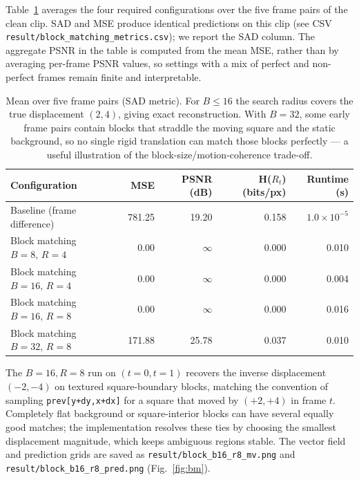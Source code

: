 \documentclass[10pt,a4paper]{article}
\begin{document}
Table~\ref{tab:bm} averages the four required configurations over the five frame pairs of the clean clip. SAD and MSE produce identical predictions on this clip (see CSV \texttt{result/block\_matching\_metrics.csv}); we report the SAD column. The aggregate PSNR in the table is computed from the mean MSE, rather than by averaging per-frame PSNR values, so settings with a mix of perfect and non-perfect frames remain finite and interpretable.

\begin{table}[H]
    \centering
    \begin{tabular}{lrrrr}
        \toprule
        Configuration & MSE & PSNR (dB) & H($R_t$) (bits/px) & Runtime (s) \\
        \midrule
        Baseline (frame difference)  & 781.25 & 19.20 & 0.158 & $1.0\!\times\!10^{-5}$ \\
        Block matching $B{=}8,\,R{=}4$  & 0.00 & $\infty$ & 0.000 & 0.010 \\
        Block matching $B{=}16,\,R{=}4$ & 0.00 & $\infty$ & 0.000 & 0.004 \\
        Block matching $B{=}16,\,R{=}8$ & 0.00 & $\infty$ & 0.000 & 0.016 \\
        Block matching $B{=}32,\,R{=}8$ & 171.88 & 25.78 & 0.037 & 0.010 \\
        \bottomrule
    \end{tabular}
    \caption{Mean over five frame pairs (SAD metric). For $B\le16$ the search radius covers the true displacement $(2,4)$, giving exact reconstruction. With $B=32$, some early frame pairs contain blocks that straddle the moving square and the static background, so no single rigid translation can match those blocks perfectly --- a useful illustration of the block-size/motion-coherence trade-off.}
    \label{tab:bm}
\end{table}

The $B{=}16,R{=}8$ run on $(t{=}0,t{=}1)$ recovers the inverse displacement $(-2,-4)$ on textured square-boundary blocks, matching the convention of sampling \texttt{prev[y+dy,x+dx]} for a square that moved by $(+2,+4)$ in frame $t$. Completely flat background or square-interior blocks can have several equally good matches; the implementation resolves these ties by choosing the smallest displacement magnitude, which keeps ambiguous regions stable. The vector field and prediction grids are saved as \texttt{result/block\_b16\_r8\_mv.png} and \texttt{result/block\_b16\_r8\_pred.png} (Fig.~\ref{fig:bm}).
\end{document}
